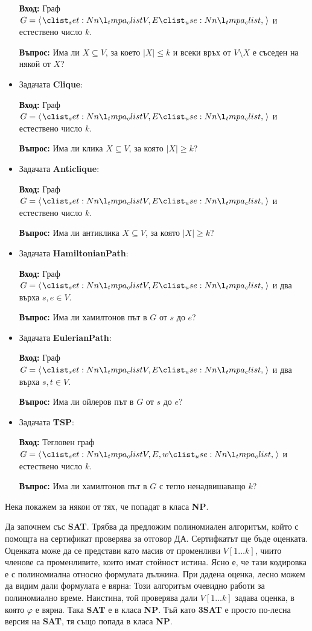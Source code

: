 \documentclass{article}
\theoremstyle{definition}
\theoremstyle{plain}
\theoremstyle{remark}
\theoremstyle{definition}
\begin{document}
\begin{itemize}
          \textbf{Вход:} Граф $G = \opair{V, E}$ и естествено число $k$.

          \textbf{Въпрос:} Има ли $X \subseteq V$, за което $|X| \leq k$ и всеки връх от $V \setminus X$ е съседен на някой от $X$?
    \item Задачата \textbf{Clique}:

          \textbf{Вход:} Граф $G = \opair{V, E}$ и естествено число $k$.

          \textbf{Въпрос:} Има ли клика $X \subseteq V$, за която $|X| \geq k$?
    \item Задачата \textbf{Anticlique}:

          \textbf{Вход:} Граф $G = \opair{V, E}$ и естествено число $k$.

          \textbf{Въпрос:} Има ли антиклика $X \subseteq V$, за която $|X| \geq k$?
    \item Задачата \textbf{HamiltonianPath}:

          \textbf{Вход:} Граф $G = \opair{V, E}$ и два върха $s, e \in V$.

          \textbf{Въпрос:} Има ли хамилтонов път в $G$ от $s$ до $e$?
    \item Задачата \textbf{EulerianPath}:

          \textbf{Вход:} Граф $G = \opair{V, E}$ и два върха $s, t \in V$.

          \textbf{Въпрос:} Има ли ойлеров път в $G$ от $s$ до $e$?
    \item Задачата \textbf{TSP}:

          \textbf{Вход:} Тегловен граф $G = \opair{V, E, w}$ и естествено число $k$.

          \textbf{Въпрос:} Има ли хамилтонов път в $G$ с тегло ненадвишаващо $k$?
\end{itemize}

Нека покажем за някои от тях, че попадат в класа \textbf{NP}.

Да започнем със \textbf{SAT}.
Трябва да предложим полиномиален алгоритъм, който с помощта на сертификат проверява за отговор ДА.
Сертифкатът ще бъде оценката.
Оценката може да се представи като масив от променливи $V[1 \dots k]$, чиито членове са променливите, които имат стойност истина.
Ясно е, че тази кодировка е с полиномиална относно формулата дължина.
При дадена оценка, лесно можем да видим дали формулата е вярна:
Този алгоритъм очевидно работи за полиномиално време.
Наистина, той проверява дали $V[1 \dots k]$ задава оценка, в която $\varphi$ е вярна.
Така \textbf{SAT} е в класа \textbf{NP}.
Тъй като \textbf{3SAT} е просто по-лесна версия на \textbf{SAT}, тя също попада в класа \textbf{NP}.
\end{document}
